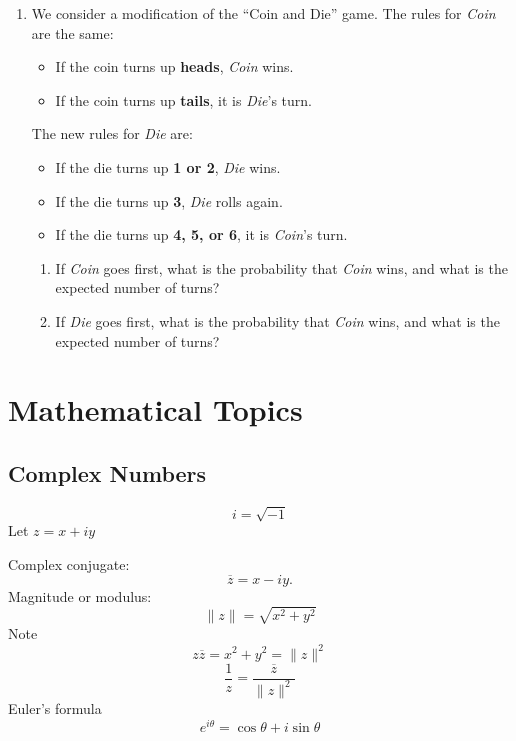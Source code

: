 \documentclass[reqno]{immbook}
\begin{document}
\begin{enumerate}
%
\item
\label{ex:markov3}
We consider a modification of the ``Coin and Die'' game.
The rules for \emph{Coin} are the same:
\begin{itemize}
\item If the coin turns up \textbf{heads}, \emph{Coin} wins.
\item If the coin turns up \textbf{tails}, it is \emph{Die}'s turn.
\end{itemize}
The new rules for \emph{Die} are:
\begin{itemize}
\item If the die turns up \textbf{1 or 2}, \emph{Die} wins.
\item If the die turns up \textbf{3}, \emph{Die} rolls again.
\item If the die turns up \textbf{4, 5, or 6}, it is \emph{Coin}'s turn.
\end{itemize}                                                                \begin{enumerate}
\item If \emph{Coin} goes first, what is the probability that
\emph{Coin} wins, and what is the expected number of turns?
\item If \emph{Die} goes first, what is the probability that
\emph{Coin} wins, and what is the expected number of turns?
\end{enumerate}
\end{enumerate}

%
\appendix
%
%
%

\chapter{Mathematical Topics}
%
%
\section{Complex Numbers}
%
\[
    i = \sqrt{-1}
\]
Let $z=x+iy$

\medskip
\noindent
Complex conjugate:
\[
   \overline{z} = x-iy.
\]
Magnitude or modulus:
\[
   \| z \| = \sqrt{x^2+y^2}
\]
Note
\[
   z \overline{z} = x^2+y^2 = \| z \|^2
\]
\[
   \frac{1}{z} = \frac{\overline{z}}{\|z\|^2}
\]
Euler's formula
\begin{equation}
   e^{i\theta} = \cos\theta + i \sin\theta
   \label{eqn:EULER}
\end{equation}
%
\end{document}
